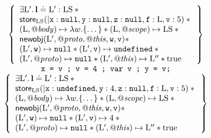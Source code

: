 \documentclass{article}
\begin{document}
\[\begin{array}{c}
        \left\{\begin{array}{l}
                \exists \V{L}'\st \ls\doteq\V{L}':\V{LS} \sep {}\\
                \store_\V{LS}(|\js{x}:\nil,\js{y}:\nil,\js{z}:\nil,\js{f}:\V{L},\js{v}:5) \sep {}\\
                (\V{L},\bodyp)\pointsto \lambda w.\{\dots\}\sep
                (\V{L},\fscopep)\pointsto \V{LS}  \sep {} \\
                \newobj(\V{L}',\protop,\thisp,\js{w},\js{v})\sep \\
                (\V{L}',\js{w})\pointsto\nil \sep 
                (\V{L}',\js{v})\pointsto\und\sep {}\\
          (\V{L}',\protop)\pointsto \nil \sep{}       (\V{L}',\thisp)\pointsto  \V{L}''\sep\true
        \end{array}\right\}\\
        \js{x = v ; v = 4 ; var v ; y = v;}\\
        \left\{\begin{array}{l}
                \exists \V{L}'\st \ls\doteq\V{L}':\V{LS} \sep {}\\
                \store_\V{LS}(|\js{x}:\und,\js{y}:4,\js{z}:\nil,\js{f}:\V{L},\js{v}:5) \sep {}\\
                (\V{L},\bodyp)\pointsto \lambda w.\{\dots\}\sep
                (\V{L},\fscopep)\pointsto \V{LS}  \sep {} \\
                \newobj(\V{L}',\protop,\thisp,\js{w},\js{v})\sep\\
                (\V{L}',\js{w})\pointsto\nil \sep 
                (\V{L}',\js{v})\pointsto 4\sep{}\\
            (\V{L}',\protop)\pointsto \nil \sep{}      (\V{L}',\thisp)\pointsto \V{L}''\sep\true
        \end{array}\right\}\\
\end{array}\]
\end{document}
